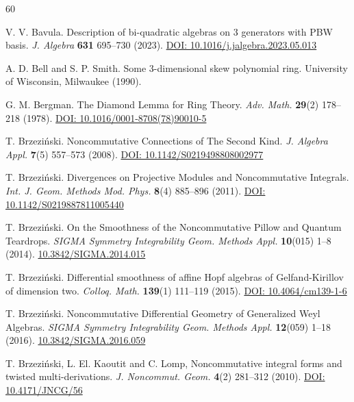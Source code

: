 \documentclass{amsart}
\theoremstyle{definition}
\theoremstyle{remark}
\numberwithin{equation}{section}
\begin{document}
\begin{thebibliography}{60}

 V. V. Bavula. Description of bi-quadratic algebras on 3 generators with PBW basis. {\em J. Algebra} {\bf 631} 695--730 (2023). \href{https://doi.org/10.1016/j.jalgebra.2023.05.013}{DOI: 10.1016/j.jalgebra.2023.05.013}

 A. D. Bell and S. P. Smith. Some 3-dimensional skew polynomial ring. University of Wisconsin, Milwaukee (1990).

 G. M. Bergman. The Diamond Lemma for Ring Theory. {\em Adv. Math.} {\bf 29}(2) 178--218 (1978). \href{https://doi.org/10.1016/0001-8708(78)90010-5}{DOI: 10.1016/0001-8708(78)90010-5}

 T. Brzezi{\'n}ski. Noncommutative Connections of The Second Kind. {\em J. Algebra Appl.} {\bf 7}(5) 557--573 (2008). \href{https://doi.org/10.1142/S0219498808002977}{DOI: 10.1142/S0219498808002977}

 T. Brzezi{\'n}ski. Divergences on Projective Modules and Noncommutative Integrals. {\em Int. J. Geom. Methods Mod. Phys.} {\bf 8}(4) 885--896 (2011). \href{https://doi.org/10.1142/S0219887811005440}{DOI: 10.1142/S0219887811005440}

 T. Brzezi{\'n}ski. On the Smoothness of the Noncommutative Pillow and Quantum Teardrops. {\em SIGMA Symmetry Integrability Geom. Methods Appl.} {\bf 10}(015) 1--8 (2014). \href{http://dx.doi.org/10.3842/SIGMA.2014.015}{10.3842/SIGMA.2014.015}

 T. Brzezi{\'n}ski. Differential smoothness of affine Hopf algebras of Gelfand-Kirillov of dimension two. {\em Colloq. Math.} {\bf 139}(1) 111--119 (2015). \href{https://www.impan.pl/en/publishing-house/journals-and-series/colloquium-mathematicum/all/139/1/87553/differential-smoothness-of-affine-hopf-algebras-of-gelfand-8211-kirillov-dimension-two}{DOI: 10.4064/cm139-1-6}

T. Brzezi\'nski. Noncommutative Differential Geometry of Generalized Weyl Algebras. {\em SIGMA Symmetry Integrability Geom. Methods Appl.} {\bf 12}(059) 1--18 (2016). \href{ http://dx.doi.org/10.3842/SIGMA.2016.059}{10.3842/SIGMA.2016.059}

 T. Brzezi{\'n}ski, L. El. Kaoutit and C. Lomp, Noncommutative integral forms and twisted multi-derivations. {\em J. Noncommut. Geom.} {\bf 4}(2) 281--312 (2010). \href{https://doi.org/10.4171/JNCG/56}{DOI: 10.4171/JNCG/56}


\end{thebibliography}
\end{document}
